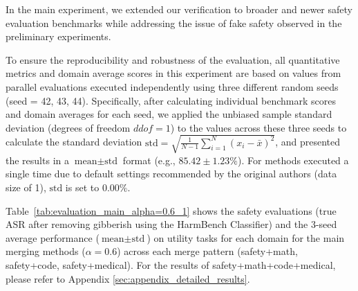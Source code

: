 \documentclass{article}
\begin{document}

In the main experiment, we extended our verification to broader and newer safety evaluation benchmarks while addressing the issue of fake safety observed in the preliminary experiments.

To ensure the reproducibility and robustness of the evaluation, all quantitative metrics and domain average scores in this experiment are based on values from parallel evaluations executed independently using three different random seeds (seed = 42, 43, 44). Specifically, after calculating individual benchmark scores and domain averages for each seed, we applied the unbiased sample standard deviation (degrees of freedom $ddof=1$) to the values across these three seeds to calculate the standard deviation $\text{std} = \sqrt{\frac{1}{N-1}\sum_{i=1}^{N}(x_i - \bar{x})^2}$, and presented the results in a $\text{mean} \pm \text{std}$ format (e.g., $85.42 \pm 1.23\%$). For methods executed a single time due to default settings recommended by the original authors (data size of 1), $\text{std}$ is set to $0.00\%$.

Table~\ref{tab:evaluation_main_alpha=0.6_1} shows the safety evaluations (true ASR after removing gibberish using the HarmBench Classifier) and the 3-seed average performance ($\text{mean} \pm \text{std}$) on utility tasks for each domain for the main merging methods ($\alpha=0.6$) across each merge pattern (safety+math, safety+code, safety+medical). For the results of safety+math+code+medical, please refer to Appendix \ref{sec:appendix_detailed_results}.
\end{document}

